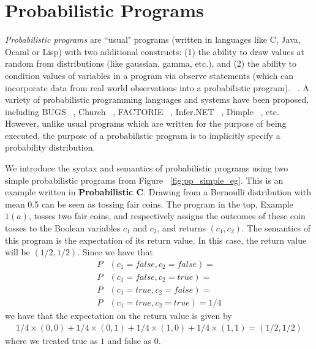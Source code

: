 \section{Probabilistic Programs}
\label{sec:pp}
\textit{Probabilistic programs} are ``usual" programs (written in languages like C, Java, Ocaml or Lisp) with two additional constructs: (1) the ability to draw values at random from distributions (like gaussian, gamma, etc.), and (2) the ability to condition values of variables in a program via observe statements (which can incorporate data from real world observations into a probabilistic program). ~\cite{gordon2014}. A variety of probabilistic programming languages and systems have been proposed, including BUGS ~\cite{bugs}, Church ~\cite{church}, FACTORIE ~\cite{factorie}, Infer.NET ~\cite{infernet}, Dimple ~\cite{dimple}, etc. However, unlike usual programs which are written for the purpose of being executed, the purpose of a probabilistic program is to implicitly specify a probability distribution. 

We introduce the syntax and semantics of probabilistic programs using two simple probabilistic programs from Figure ~\ref{fig:pp_simple_eg}. This is an example written in \textbf{Probabilistic C}. Drawing from a Bernoulli distribution with mean 0.5 can be seen as tossing fair coins. The program in the top, Example $1(a)$, tosses two fair coins, and respectively assigns the outcomes of these coin tosses to the Boolean variables $c_1$ and $c_2$, and returns $(c_1, c_2)$. The semantics of this program is the expectation of its return value. In this case, the return value will be $(1/2, 1/2)$. Since we have that 
\begin{align*}
  P & ( c_1 = false, c_2 = false) =\\
  P & (c_1=false, c_2=true) = \\
  P & (c_1=true, c_2=false) = \\
  P & (c_1=true, c_2=true) = 1/4
\end{align*}
we have that the expectation on the return value is given by 
\begin{align*}
  1/4 \times (0, 0) + 1/4 \times (0, 1) + 1/4 \times (1, 0) + 1/4 \times (1, 1) = (1/2, 1/2)
\end{align*}
where we treated true as $1$ and false as $0$.

